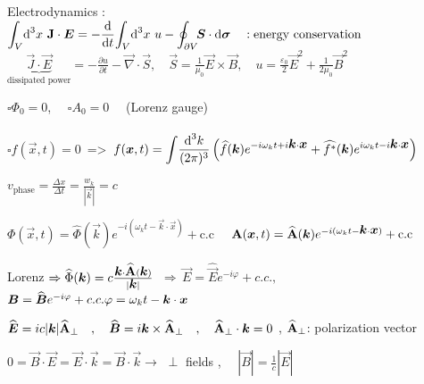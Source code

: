 \item Electrodynamics : $\displaystyle{\int_{V}} \ud ^3x \,\, \vec{\rm{J}}\cdot\vec{E} = - \frac{\ud }{\ud t} \displaystyle{\int_{V}} \ud ^3x \,\, u - \displaystyle{\oint_{\partial V}} \! \vec{S}\cdot\vec{\ud \sigma} \quad : \text{energy conservation}$
\\
$\underbrace{\vec{J}\cdot\vec{E}}_{\text{dissipated power}} = -\frac{\partial u}{\partial t} - \vec{\nabla}\cdot\vec{S}, \quad \vec{S} = \frac{1}{\mu_0} \vec{E}\times\vec{B} , \quad u=\frac{\varepsilon_0}{2} \vec{E}^2 + \frac{1}{2\mu_0} \vec{B}^2$
\squishend

$\square \Phi_0 = 0$, $\quad \square A_0 = 0 \quad$ (Lorenz gauge)
\\
\\
$\square f(\vec{x},t) = 0 \, $ => $\, f(\vec{x},t) = \displaystyle{\int} \frac{\ud ^3k}{(2\pi)^3} \left(\widehat{f}(\vec{k})e^{-i\omega_kt + i\vec{k}\cdot\vec{x}} + \widehat{f^*}(\vec{k})e^{i\omega_k t - i \vec{k}\cdot\vec{x}} \right)$
\\
\squishlist
\item $v_{\text{phase}} = \frac{\Delta x}{\Delta t} = \frac{w_k}{|\vec{k}|} = c$

\item $\Phi(\vec{x},t) = \widehat{\Phi}(\vec{k}) e^{-i(\omega_k t- \vec{k}\cdot\vec{x})} + \text{c.c}$ $ \quad \vec{\rm{A}}(\vec{x},t) = \widehat{\vec{\rm{A}}}(\vec{k}) e^{-i(\omega_k t-\vec{k}\cdot\vec{x})} + \text{c.c}$ 

\item Lorenz $ \Rightarrow \widehat{\Phi}(\vec{k}) = c\frac{\vec{k}\cdot\widehat{\vec{\rm{A}}}(\vec{k})}{|\vec{k}|} \,$ $\Rightarrow \, \vec{E} = \widehat{\vec{E}} e^{-i\varphi}+c.c., $ $\vec{B} = \widehat{\vec{B}} e^{-i\varphi}+c.c.\newline \varphi = \omega_k t - \vec{k}\cdot\vec{x}$

\item $\widehat{\vec{E}} = i c |\vec{k}| \widehat{\vec{\rm{A}}}_{\perp} \quad, \quad \widehat{\vec{B}} = i \vec{k} \times \widehat{\vec{\rm{A}}}_{\perp} \quad, \quad \widehat{\vec{\rm{A}}}_{\perp} \cdot \vec{k}=0$ , $\widehat{\vec{\rm{A}}}_{\perp}$: polarization vector

\item $0 = \vec{B}\cdot\vec{E} = \vec{E}\cdot\vec{k} = \vec{B}\cdot\vec{k} \rightarrow$ $\perp$ fields , $\quad |\vec{B}| = \frac{1}{c}|\vec{E}|$

